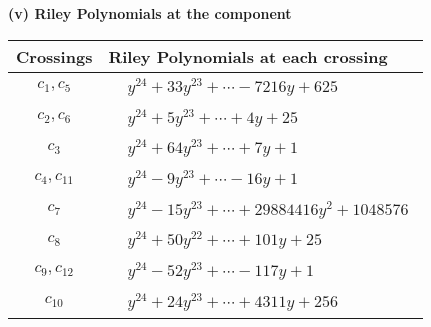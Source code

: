 \documentclass[1p]{elsarticle_modified}
\theoremstyle{definition}
\begin{document}
\newpage\renewcommand{\arraystretch}{1}
\flushleft \textbf{(v) Riley Polynomials at the component}\newline \\
\begin{tabular}{m{50pt}|m{274pt}}
Crossings & \hspace{64pt}Riley Polynomials at each crossing \\
\hline $$\begin{aligned}c_{1},c_{5}\end{aligned}$$&$\begin{aligned}
&y^{24}+33 y^{23}+\cdots-7216 y+625
\end{aligned}$\\
\hline $$\begin{aligned}c_{2},c_{6}\end{aligned}$$&$\begin{aligned}
&y^{24}+5 y^{23}+\cdots+4 y+25
\end{aligned}$\\
\hline $$\begin{aligned}c_{3}\end{aligned}$$&$\begin{aligned}
&y^{24}+64 y^{23}+\cdots+7 y+1
\end{aligned}$\\
\hline $$\begin{aligned}c_{4},c_{11}\end{aligned}$$&$\begin{aligned}
&y^{24}-9 y^{23}+\cdots-16 y+1
\end{aligned}$\\
\hline $$\begin{aligned}c_{7}\end{aligned}$$&$\begin{aligned}
&y^{24}-15 y^{23}+\cdots+29884416 y^2+1048576
\end{aligned}$\\
\hline $$\begin{aligned}c_{8}\end{aligned}$$&$\begin{aligned}
&y^{24}+50 y^{22}+\cdots+101 y+25
\end{aligned}$\\
\hline $$\begin{aligned}c_{9},c_{12}\end{aligned}$$&$\begin{aligned}
&y^{24}-52 y^{23}+\cdots-117 y+1
\end{aligned}$\\
\hline $$\begin{aligned}c_{10}\end{aligned}$$&$\begin{aligned}
&y^{24}+24 y^{23}+\cdots+4311 y+256
\end{aligned}$\\
\hline
\end{tabular}\\~\\
\end{document}

